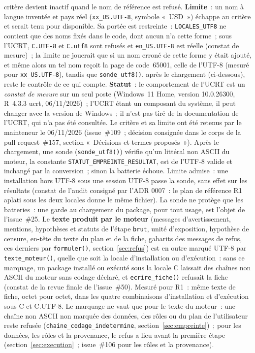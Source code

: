 \documentclass[a4paper,11pt]{article}
\newcommand{\code}[1]{\texttt{\small #1}}
\begin{document}
critère devient inactif quand le nom de référence est refusé.
\textbf{Limite}~: un nom
à langue inventée et pays réel (\code{xx\_US.UTF-8}, symbole «~USD~»)
échappe au critère et serait tenu pour disponible. Sa portée est
restreinte~: \code{LOCALES\_UTF8} ne contient que des noms fixés dans le
code, dont aucun n'a cette forme~; sous l'UCRT, \code{C.UTF-8} et
\code{C.utf8} sont refusés et \code{en\_US.UTF-8} est réelle (constat de
mesure)~; la limite ne jouerait que si un nom erroné de cette forme y était
ajouté, et même alors un tel nom reçoit la page de code~65001, celle de
l'UTF-8 (mesuré pour \code{xx\_US.UTF-8}), tandis que \code{sonde\_utf8()},
après le chargement (ci-dessous), reste le contrôle de ce qui compte.
\textbf{Statut}~: le comportement de l'UCRT est un \emph{constat de mesure}
sur un seul poste (Windows~11 Home, version 10.0.26300, R~4.3.3 ucrt,
06/11/2026)~; l'UCRT étant un composant du système, il peut changer avec la
version de Windows~; il n'est pas tiré de la documentation de l'UCRT, qui
n'a pas été consultée. Le critère et sa limite ont été retenus par le
mainteneur le 06/11/2026 (issue~\#109~; décision consignée dans le corps de
la pull request~\#157, section «~Décisions et termes proposés~»). Après le chargement, une sonde
(\code{sonde\_utf8()}) vérifie qu'un littéral non ASCII du moteur, la
constante \code{STATUT\_EMPREINTE\_RESULTAT}, est de l'UTF-8 valide et
inchangé par la conversion~; sinon la batterie échoue. Limite admise~: une
installation hors UTF-8 sous une session UTF-8 passe la sonde, sans effet sur
les résultats (constat de l'audit consigné par l'ADR 0007~: le plan de
référence R1 aplati sous les deux locales donne le même fichier). La sonde ne
protège que les batteries~: une garde au chargement du package, pour tout
usage, est l'objet de l'issue~\#25. Le \textbf{texte produit par le moteur}
(messages d'avertissement, mentions, hypothèses et statuts de l'étape
\code{brut}, unité d'exposition, hypothèse de censure, en-tête du texte du
plan et de la fiche, gabarits des messages de refus, ces derniers par
\code{formuler()}, section~\ref{sec:refus}) est en outre marqué UTF-8 par
\code{texte\_moteur()},
quelle que soit la locale d'installation ou d'exécution~: sans ce marquage,
un package installé ou exécuté sous la locale C laissait des chaînes non
ASCII du moteur sans codage déclaré, et \code{ecrire\_fiche()} refusait la
fiche (constat de la revue finale de l'issue~\#50). Mesuré pour R1~: même
texte de fiche, octet pour octet, dans les quatre combinaisons d'installation
et d'exécution sous C et C.UTF-8. Le marquage ne vaut que pour le texte du
moteur~: une chaîne non ASCII non marquée des données, des rôles ou du plan
de l'utilisateur reste refusée (\code{chaine\_codage\_indetermine},
section~\ref{sec:empreinte})~; pour les données, les rôles et la
provenance, le refus a lieu avant la première étape
(section~\ref{sec:execution}~; issue~\#106 pour les rôles et la
provenance).
\end{document}

